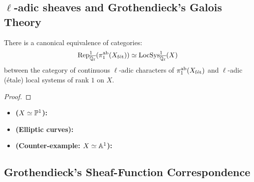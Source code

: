     \subsection{\texorpdfstring{$\ell$}{}-adic sheaves and Grothendieck's Galois Theory}
        \begin{theorem} \label{theorem: unramified_representations_are_sheaves_on_X}
            There is a canonical equivalence of categories:
                $$\Rep^1_{\overline{\Q_{\ell}}}(\pi_1^{\ab}(X_{\fet})) \cong \LocSys^1_{\overline{\Q_{\ell}}}(X)$$
            between the category of continuous $\ell$-adic characters of $\pi_1^{\ab}(X_{\fet})$ and $\ell$-adic (\'etale) local systems of rank $1$ on $X$.
        \end{theorem}
            \begin{proof}
                
            \end{proof}
        \begin{example}
            \noindent
            \begin{itemize}
                \item \textbf{($X \cong \P^1$):}
                \item \textbf{(Elliptic curves):}
                \item \textbf{(Counter-example: $X \cong \A^1$):}
            \end{itemize}
        \end{example}
        
    \subsection{Grothendieck's Sheaf-Function Correspondence}